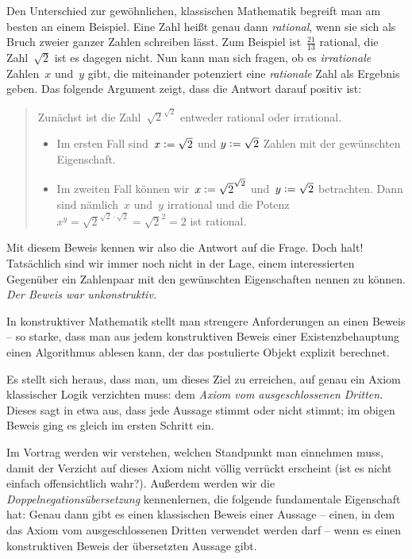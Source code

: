 \documentclass[a4paper,ngerman,10pt]{scrartcl}
\theoremstyle{plain}
\newcommand{\defeq}{\vcentcolon=}
\begin{document}
Den Unterschied zur gewöhnlichen, klassischen Mathematik begreift man am besten
an einem Beispiel. Eine Zahl heißt genau dann \emph{rational}, wenn sie sich als Bruch zweier
ganzer Zahlen schreiben lässt. Zum Beispiel ist~$\frac{21}{13}$ rational, die
Zahl~$\sqrt{2}$ ist es dagegen nicht. Nun kann man sich fragen, ob es
\emph{irrationale} Zahlen~$x$ und~$y$ gibt, die miteinander potenziert eine
\emph{rationale} Zahl als Ergebnis geben. Das folgende Argument zeigt, dass die
Antwort darauf positiv ist:
\begin{quote}
Zunächst ist die Zahl~$\sqrt{2}^{\sqrt{2}}$ entweder rational oder irrational.

\begin{itemize}
\item Im ersten Fall sind~$x \defeq \sqrt{2}$ und $y \defeq \sqrt{2}$ Zahlen
mit der gewünschten Eigenschaft.
\item Im zweiten Fall können wir~$x \defeq \sqrt{2}^{\sqrt{2}}$ und~$y \defeq
\sqrt{2}$ betrachten. Dann sind nämlich~$x$ und~$y$ irrational und die Potenz
$x^y = \sqrt{2}^{\sqrt{2} \cdot \sqrt{2}} = \sqrt{2}^2 = 2$ ist rational.
\end{itemize}
\end{quote}
Mit diesem Beweis kennen wir also die Antwort auf die Frage. Doch halt!
Tatsächlich sind wir immer noch nicht in der Lage, einem interessierten
Gegenüber ein Zahlenpaar mit den gewünschten Eigenschaften nennen zu können.
\emph{Der Beweis war unkonstruktiv.}

In konstruktiver Mathematik stellt man strengere Anforderungen an einen Beweis
-- so starke, dass man aus jedem konstruktiven Beweis einer Existenzbehauptung
einen Algorithmus ablesen kann, der das postulierte Objekt explizit berechnet.

Es stellt sich heraus, dass man, um dieses Ziel zu erreichen, auf genau ein
Axiom klassischer Logik verzichten muss: dem \emph{Axiom vom ausgeschlossenen
Dritten}. Dieses sagt in etwa aus, dass jede Aussage stimmt oder nicht stimmt;
im obigen Beweis ging es gleich im ersten Schritt ein.

Im Vortrag werden wir verstehen, welchen Standpunkt man einnehmen muss, damit
der Verzicht auf dieses Axiom nicht völlig verrückt erscheint (ist es nicht
einfach offensichtlich wahr?). Außerdem werden wir die
\emph{Doppelnegationsübersetzung} kennenlernen, die folgende fundamentale
Eigenschaft hat: Genau dann gibt es einen klassischen Beweis einer Aussage
-- einen, in dem das Axiom vom ausgeschlossenen Dritten verwendet werden darf
-- wenn es einen konstruktiven Beweis der übersetzten Aussage gibt.
\end{document}
